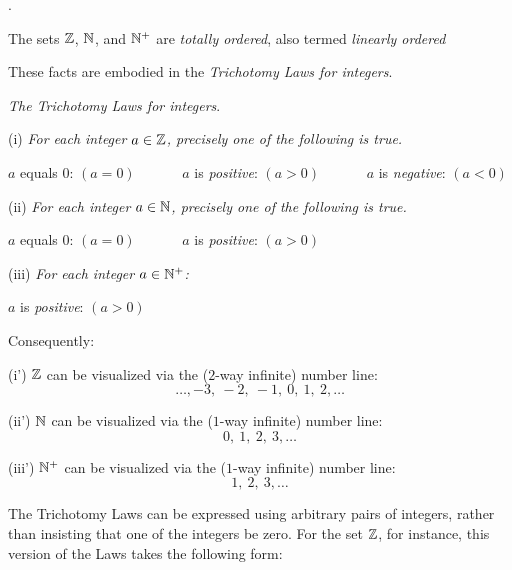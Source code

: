  
 .


The sets $\mathbb{Z}$, $\mathbb{N}$, and $\mathbb{N}^+$ are {\em totally ordered}, also termed {\em linearly ordered}

\smallskip

  

These facts are embodied in the {\em Trichotomy Laws for integers}.

\medskip

{\it The Trichotomy Laws for integers}.

\smallskip

(i)
{\it For each integer $a \in \mathbb{Z}$, precisely one of the following is true.}

\hspace*{.2in} $a$ equals $0$: $(a=0)$ \ \ \ \ \ \
 $a$ is {\em positive}: $(a>0)$ \ \ \ \ \ \
 $a$ is {\em negative}: $(a<0)$

\smallskip

(ii)
{\it For each integer $a \in \mathbb{N}$, precisely one of the following is true.}

\hspace*{.2in} $a$ equals $0$: $(a=0)$ \ \ \ \ \ \
 $a$ is {\em positive}: $(a>0)$

\smallskip

(iii)
{\it For each integer $a \in \mathbb{N}^+$:}

\hspace*{.2in} $a$ is {\em positive}: $(a>0)$

\bigskip

Consequently:
\smallskip


(i')
$\mathbb{Z}$ can be visualized via the ($2$-way infinite) number line:
\[ \ldots, -3, \  -2, \ -1, \ 0, \ 1,\  2, \ldots \]
\smallskip

(ii')
$\mathbb{N}$ can be visualized via the ($1$-way infinite) number line:
\[  0, \ 1, \ 2, \ 3, \ldots \]
\smallskip

(iii')
$\mathbb{N}^+$ can be visualized via the ($1$-way infinite) number line:
\[  1, \ 2, \ 3, \ldots \]

\medskip

The Trichotomy Laws can be expressed using arbitrary pairs of integers, rather than insisting that one of the integers be zero.  For the set $\mathbb{Z}$, for instance, this version of the Laws takes the following form:

